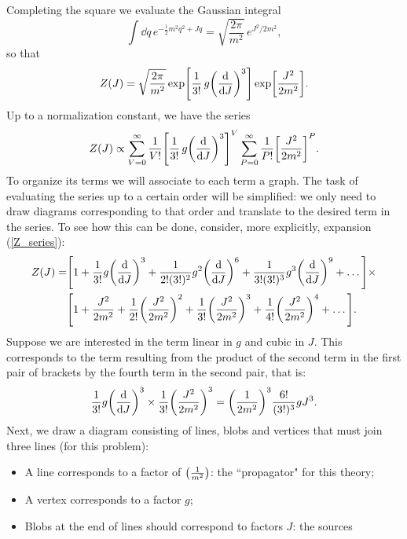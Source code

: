Completing the square we evaluate the Gaussian integral
\begin{equation}
    \int\dd q\, e^{-\frac{1}{2}m^2q^2+Jq}=\sqrt{\frac{2\pi}{m^2}}\,e^{J^2/2m^2},
\end{equation}
so that
\begin{equation}
    Z(J)=\sqrt{\frac{2\pi}{m^2}}\exp[\frac{1}{3!}\,g\qty(\dv{J})^3]\exp[\frac{J^2}{2m^2}].
    \label{Z_exps}
\end{equation}
Up to a normalization constant, we have the series
\begin{equation}
    Z(J)\propto\sum_{V=0}^\infty\frac{1}{V!}\qty[\frac{1}{3!}\,g\qty(\dv{J})^3]^V\sum_{P=0}^\infty\frac{1}{P!}\qty[\frac{J^2}{2m^2}]^P.
    \label{Z_series}
\end{equation}
To organize its terms we will associate to each term a graph. The task of evaluating the series up to a certain order will be simplified: we only need to draw diagrams corresponding to that order and translate to the desired term in the series. To see how this can be done, consider, more explicitly, expansion (\ref{Z_series}):
\begin{equation}
\begin{aligned}
    Z(J)=&\qty[1+\frac{1}{3!}g\qty(\dv{J})^3+\frac{1}{2!(3!)^2}g^2\qty(\dv{J})^6+\frac{1}{3!(3!)^3}g^3\qty(\dv{J})^9+\dots]\times\\
    &\qty[1+\frac{J^2}{2m^2}+\frac{1}{2!}\qty(\frac{J^2}{2m^2})^2+\frac{1}{3!}\qty(\frac{J^2}{2m^2})^3+\frac{1}{4!}\qty(\frac{J^2}{2m^2})^4+\dots].
    \label{expansaozona}
\end{aligned}
\end{equation}
Suppose we are interested in the term linear in $g$ and cubic in $J$. This corresponds to the term resulting from the product of the second term in the first pair of brackets by the fourth term in the second pair, that is:
    \begin{equation}
    \frac{1}{3!}g\qty(\dv{J})^3\times\frac{1}{3!}\qty(\frac{J^2}{2m^2})^3=\qty(\frac{1}{2m^2})^3\frac{6!}{(3!)^3}gJ^3.
    \label{termogJ3}
    \end{equation}
Next, we draw a diagram
consisting of lines, blobs and vertices that must join three lines (for this problem):
\begin{itemize}
    \item A line corresponds to a factor of $\qty(\frac{1}{m^2})$: the ``propagator" for this theory;
    \item A vertex corresponds to a factor $g$;
    \item Blobs at the end of lines should correspond to factors $J$: the sources
\end{itemize}
